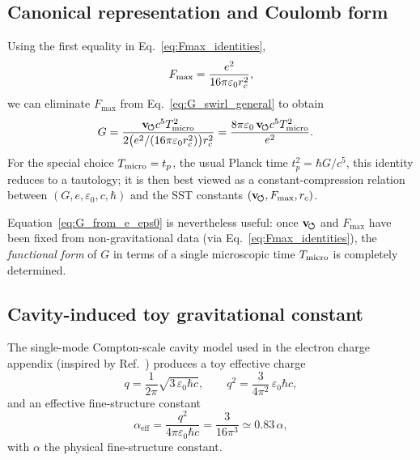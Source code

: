 \documentclass[11pt]{article}
\begin{document}
        \subsection{Canonical representation and Coulomb form}

            Using the first equality in Eq.~\eqref{eq:Fmax_identities},
            \begin{equation}
                F_{\max}
                = \frac{e^2}{16\pi\varepsilon_0 r_c^2},
            \end{equation}
            we can eliminate $F_{\max}$ from Eq.~\eqref{eq:G_swirl_general} to
            obtain
            \begin{align}
                G
                &= \frac{\mathbf{v}_{\!\boldsymbol{\circlearrowleft}} c^5 T_{\rm micro}^2}
                {2 \bigl(e^2/(16\pi\varepsilon_0 r_c^2)\bigr)r_c^2}
                = \frac{8\pi \varepsilon_0\,\mathbf{v}_{\!\boldsymbol{\circlearrowleft}} c^5 T_{\rm micro}^2}{e^2}.
                \label{eq:G_from_e_eps0}
            \end{align}
            For the special choice $T_{\rm micro} = t_p$, the usual Planck time
            $t_p^2 = \hbar G / c^5$, this identity reduces to a tautology; it is
            then best viewed as a constant-compression
            relation between $(G,e,\varepsilon_0,c,\hbar)$ and the SST constants
            $(\mathbf{v}_{\!\boldsymbol{\circlearrowleft}},F_{\max},r_c)$.

            Equation~\eqref{eq:G_from_e_eps0} is nevertheless useful: once
            $\mathbf{v}_{\!\boldsymbol{\circlearrowleft}}$ and $F_{\max}$ have been fixed from non-gravitational
            data (via Eq.~\eqref{eq:Fmax_identities}), the \emph{functional form}
            of $G$ in terms of a single microscopic time $T_{\rm micro}$ is
            completely determined.

        \subsection{Cavity-induced toy gravitational constant}

            The single-mode Compton-scale cavity model used in the electron charge
            appendix (inspired by Ref.~\cite{WilliamsonVanDerMark1997}) produces a
            toy effective charge
            \begin{equation}
                q
                = \frac{1}{2\pi}\sqrt{3\,\varepsilon_0 \hbar c},
                \qquad
                q^2 = \frac{3}{4\pi^2}\,\varepsilon_0 \hbar c,
                \label{eq:q_toy}
            \end{equation}
            and an effective fine-structure constant
            \begin{equation}
                \alpha_{\mathrm{eff}}
                = \frac{q^2}{4\pi\varepsilon_0\hbar c}
                = \frac{3}{16\pi^3}
                \simeq 0.83\,\alpha,
            \end{equation}
            with $\alpha$ the physical fine-structure constant.
\end{document}

